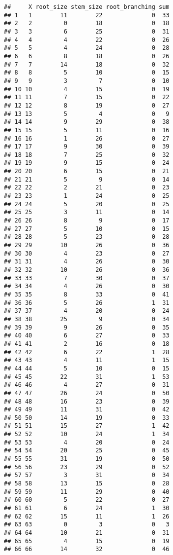 \documentclass[
]{article}
\begin{document}
\begin{verbatim}
##     X root_size stem_size root_branching sum
## 1   1        11        22              0  33
## 2   2         0        18              0  18
## 3   3         6        25              0  31
## 4   4         4        22              0  26
## 5   5         4        24              0  28
## 6   6         8        18              0  26
## 7   7        14        18              0  32
## 8   8         5        10              0  15
## 9   9         3         7              0  10
## 10 10         4        15              0  19
## 11 11         7        15              0  22
## 12 12         8        19              0  27
## 13 13         5         4              0   9
## 14 14         9        29              0  38
## 15 15         5        11              0  16
## 16 16         1        26              0  27
## 17 17         9        30              0  39
## 18 18         7        25              0  32
## 19 19         9        15              0  24
## 20 20         6        15              0  21
## 21 21         5         9              0  14
## 22 22         2        21              0  23
## 23 23         1        24              0  25
## 24 24         5        20              0  25
## 25 25         3        11              0  14
## 26 26         8         9              0  17
## 27 27         5        10              0  15
## 28 28         5        23              0  28
## 29 29        10        26              0  36
## 30 30         4        23              0  27
## 31 31         4        26              0  30
## 32 32        10        26              0  36
## 33 33         7        30              0  37
## 34 34         4        26              0  30
## 35 35         8        33              0  41
## 36 36         5        26              1  31
## 37 37         4        20              0  24
## 38 38        25         9              0  34
## 39 39         9        26              0  35
## 40 40         6        27              0  33
## 41 41         2        16              0  18
## 42 42         6        22              1  28
## 43 43         4        11              1  15
## 44 44         5        10              0  15
## 45 45        22        31              1  53
## 46 46         4        27              0  31
## 47 47        26        24              0  50
## 48 48        16        23              0  39
## 49 49        11        31              0  42
## 50 50        14        19              0  33
## 51 51        15        27              1  42
## 52 52        10        24              1  34
## 53 53         4        20              0  24
## 54 54        20        25              0  45
## 55 55        31        19              0  50
## 56 56        23        29              0  52
## 57 57         3        31              0  34
## 58 58        13        15              0  28
## 59 59        11        29              0  40
## 60 60         5        22              0  27
## 61 61         6        24              1  30
## 62 62        15        11              1  26
## 63 63         0         3              0   3
## 64 64        10        21              0  31
## 65 65         4        15              0  19
## 66 66        14        32              0  46
\end{verbatim}
\end{document}
